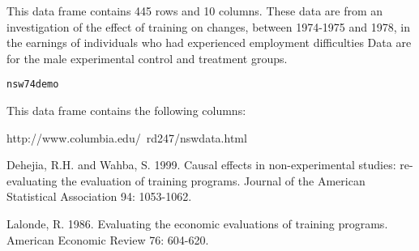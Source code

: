 \begin{Description}\relax
This data frame contains 445 rows and 10 columns. These
data are from an investigation of the effect of training
on changes, between 1974-1975 and 1978, in the earnings
of individuals who had experienced employment difficulties
Data are for the male experimental control and treatment
groups.
\end{Description}
\begin{Usage}
\begin{verbatim}nsw74demo\end{verbatim}
\end{Usage}
\begin{Format}\relax
This data frame contains the following columns:
\end{Format}
\begin{Source}\relax
http://www.columbia.edu/~rd247/nswdata.html
\end{Source}
\begin{References}\relax
Dehejia, R.H. and Wahba, S. 1999. Causal effects in
non-experimental studies: re-evaluating the evaluation of training
programs. Journal of the American Statistical Association 94:
1053-1062.

Lalonde, R. 1986. Evaluating the economic evaluations of
training programs. American Economic Review 76: 604-620.
\end{References}

